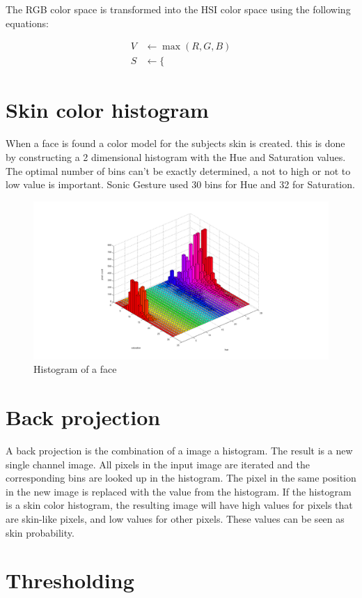 The RGB color space is transformed into the HSI color space using the following equations:

\begin{eqnarray*}
	V&\leftarrow \max(R,G,B) \label{first} \\
	S&\leftarrow \{
\end{eqnarray*}



\section{Skin color histogram}
When a face is found a color model for the subjects skin is created. this is done by constructing a 2 dimensional histogram with the Hue and Saturation values. The optimal number of bins can't be exactly determined, a not to high or not to low value is important. 
Sonic Gesture used 30 bins for Hue and 32 for Saturation. 

\begin{figure}[htbp]
	\center
	\includegraphics[width=0.8\linewidth]{figures/face_hist.png}
	\caption{Histogram of a face}
	\label{fig:face_hsv}
\end{figure}

\section{Back projection}
A back projection is the combination of a image a histogram. The result is a new single channel image. All pixels in the input image are iterated and the corresponding bins are looked up in the histogram. The pixel in the same position in the new image is replaced with the value from the histogram. If the histogram is a skin color histogram, the resulting image will have high values for pixels that are skin-like pixels, and low values for other pixels. These values can be seen as skin probability.

\section{Thresholding}


